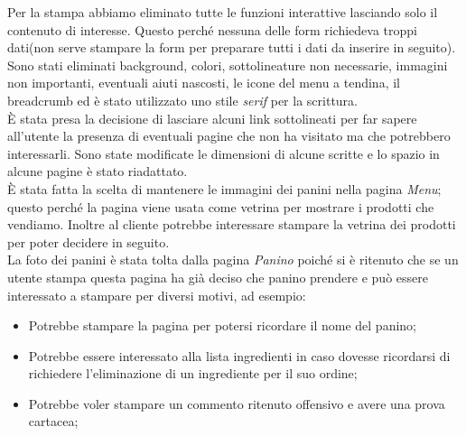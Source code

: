 Per la stampa abbiamo eliminato tutte le funzioni interattive lasciando solo il contenuto di interesse.
Questo perché nessuna delle form richiedeva troppi dati(non serve stampare la form per preparare tutti i dati da inserire in seguito).\\
Sono stati eliminati background, colori, sottolineature non necessarie, immagini non importanti, eventuali aiuti nascosti, le icone del menu a tendina, il breadcrumb ed è stato utilizzato uno stile \emph{serif} per la scrittura.\\
È stata presa la decisione di lasciare alcuni link sottolineati per far sapere all'utente la presenza di eventuali pagine che non ha visitato ma che potrebbero interessarli. %
Sono state modificate le dimensioni di alcune scritte e lo spazio in alcune pagine è stato riadattato.\\
È stata fatta la scelta di mantenere le immagini dei panini nella pagina \emph{Menu}; 
questo perché la pagina viene usata come vetrina per mostrare i prodotti che vendiamo.
Inoltre al cliente potrebbe interessare stampare la vetrina dei prodotti per poter decidere in seguito.\\
La foto dei panini è stata tolta dalla pagina \emph{Panino} poiché si è ritenuto che se un utente stampa questa pagina ha già deciso che panino prendere e può essere interessato a stampare per diversi motivi, ad esempio:
\begin{itemize}
	\item Potrebbe stampare la pagina per potersi ricordare il nome del panino;
	\item Potrebbe essere interessato alla lista ingredienti in caso dovesse ricordarsi di richiedere l'eliminazione di un ingrediente per il suo ordine;
	\item Potrebbe voler stampare un commento ritenuto offensivo e avere una prova cartacea;
\end{itemize}